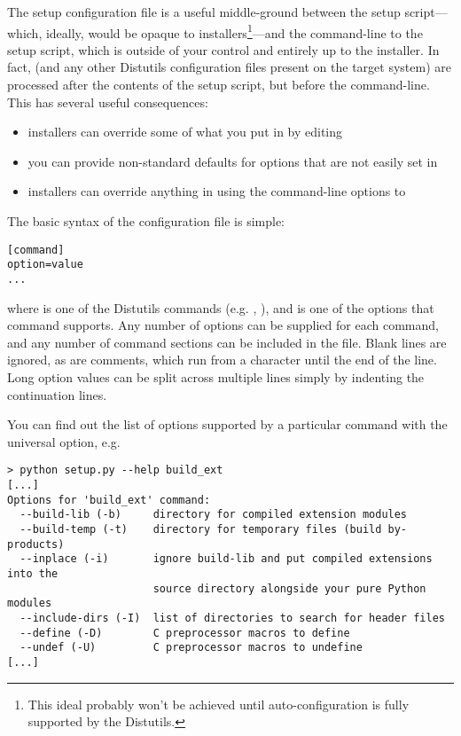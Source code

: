 \documentclass{manual}
\begin{document}

The setup configuration file is a useful middle-ground between the setup
script---which, ideally, would be opaque to installers\footnote{This
  ideal probably won't be achieved until auto-configuration is fully
  supported by the Distutils.}---and the command-line to the setup
script, which is outside of your control and entirely up to the
installer.  In fact,  (and any other Distutils
configuration files present on the target system) are processed after
the contents of the setup script, but before the command-line.  This has 
several useful consequences:
\begin{itemize}
\item installers can override some of what you put in  by
  editing 
\item you can provide non-standard defaults for options that are not
  easily set in 
\item installers can override anything in  using the
  command-line options to 
\end{itemize}

The basic syntax of the configuration file is simple:

\begin{verbatim}
[command]
option=value
...
\end{verbatim}

where  is one of the Distutils commands (e.g.
, ), and  is one of
the options that command supports.  Any number of options can be
supplied for each command, and any number of command sections can be
included in the file.  Blank lines are ignored, as are comments, which
run from a \character{\#} character until the end of the line.  Long
option values can be split across multiple lines simply by indenting
the continuation lines.

You can find out the list of options supported by a particular command
with the universal  option, e.g.

\begin{verbatim}
> python setup.py --help build_ext
[...]
Options for 'build_ext' command:
  --build-lib (-b)     directory for compiled extension modules
  --build-temp (-t)    directory for temporary files (build by-products)
  --inplace (-i)       ignore build-lib and put compiled extensions into the
                       source directory alongside your pure Python modules
  --include-dirs (-I)  list of directories to search for header files
  --define (-D)        C preprocessor macros to define
  --undef (-U)         C preprocessor macros to undefine
[...]
\end{verbatim}
\end{document}
